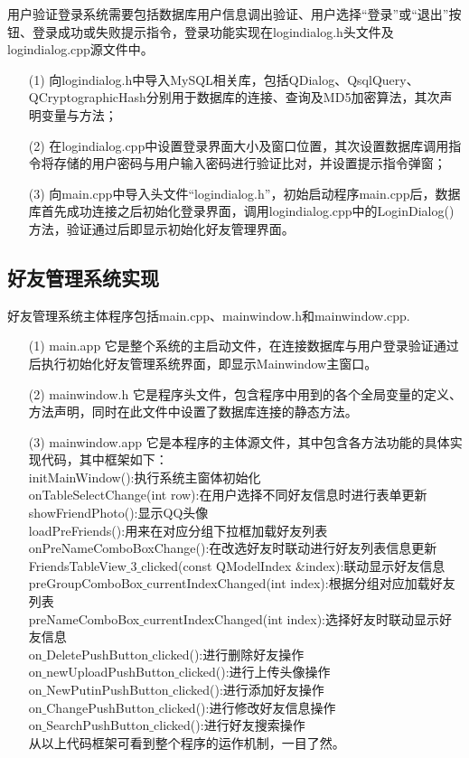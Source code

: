\documentclass{progartcn}
\begin{document}
用户验证登录系统需要包括数据库用户信息调出验证、用户选择“登录”或“退出”按钮、登录成功或失败提示指令，登录功能实现在logindialog.h头文件及logindialog.cpp源文件中。
\begin{enumerate}[itemsep=0.01pt]
	\item[(1)] 向logindialog.h中导入MySQL相关库，包括QDialog、QsqlQuery、QCryptographicHash分别用于数据库的连接、查询及MD5加密算法，其次声明变量与方法；
	\item[(2)] 在logindialog.cpp中设置登录界面大小及窗口位置，其次设置数据库调用指令将存储的用户密码与用户输入密码进行验证比对，并设置提示指令弹窗；
	\item[(3)] 向main.cpp中导入头文件“logindialog.h”，初始启动程序main.cpp后，数据库首先成功连接之后初始化登录界面，调用logindialog.cpp中的LoginDialog()方法，验证通过后即显示初始化好友管理界面。
\end{enumerate}

\subsection{好友管理系统实现}
好友管理系统主体程序包括main.cpp、mainwindow.h和mainwindow.cpp.

\begin{enumerate}[itemsep=0.01pt]
	\item[(1)] main.app
它是整个系统的主启动文件，在连接数据库与用户登录验证通过后执行初始化好友管理系统界面，即显示Mainwindow主窗口。
\item[(2)]mainwindow.h
它是程序头文件，包含程序中用到的各个全局变量的定义、方法声明，同时在此文件中设置了数据库连接的静态方法。
\item[(3)]mainwindow.app
它是本程序的主体源文件，其中包含各方法功能的具体实现代码，其中框架如下：\\
initMainWindow():执行系统主窗体初始化\\
onTableSelectChange(int row):在用户选择不同好友信息时进行表单更新\\
showFriendPhoto():显示QQ头像\\
loadPreFriends():用来在对应分组下拉框加载好友列表\\
onPreNameComboBoxChange():在改选好友时联动进行好友列表信息更新\\
FriendsTableView$\_$3$\_$clicked(const QModelIndex $ \& $index):联动显示好友信息\\
preGroupComboBox$\_$currentIndexChanged(int index):根据分组对应加载好友列表\\
preNameComboBox$\_$currentIndexChanged(int index):选择好友时联动显示好友信息\\
on$\_$DeletePushButton$\_$clicked():进行删除好友操作\\
on$\_$newUploadPushButton$\_$clicked():进行上传头像操作\\
on$\_$NewPutinPushButton$\_$clicked():进行添加好友操作\\
on$\_$ChangePushButton$\_$clicked():进行修改好友信息操作\\
on$\_$SearchPushButton$\_$clicked():进行好友搜索操作\\
从以上代码框架可看到整个程序的运作机制，一目了然。
\end{enumerate}
\end{document}
